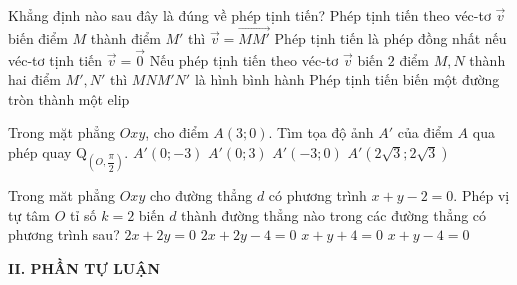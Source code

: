\begin{ex}%
Khẳng định nào sau đây là đúng về phép tịnh tiến?
	\choice
{\True Phép tịnh tiến theo véc-tơ $\vec{v}$ biến điểm $M$ thành điểm $M'$ thì $\vec{v} = \vec{MM'}$}
{Phép tịnh tiến là phép đồng nhất nếu véc-tơ tịnh tiến $\vec{v} = \vec{0}$}
{Nếu phép tịnh tiến theo véc-tơ $\vec{v}$ biến $2$ điểm $M, N$ thành hai điểm $M', N'$ thì $MNM'N'$ là hình bình hành}
{Phép tịnh tiến biến một đường tròn thành một elip}
\end{ex}
\begin{ex}%
Trong mặt phẳng $Oxy$, cho điểm $A(3;0)$. Tìm tọa độ ảnh $A'$ của điểm $A$ qua phép quay $\mathrm{Q}_{\left(O,\dfrac{\pi}{2} \right)}$.
	\choice
{$A'(0;-3)$}
{\True $A'(0;3)$}
{$A'(-3;0)$}
{$A'(2\sqrt{3};2\sqrt{3})$}
\end{ex}
\begin{ex}%
Trong măt phẳng $Oxy$ cho đường thẳng $d$ có phương trình $x + y - 2 = 0$. Phép vị tự
tâm $O$ tỉ số $k=2$ biến $d$ thành đường thẳng nào trong các đường thẳng có phương trình sau?
	\choice
{\True $2x+2y=0$}
{$2x+2y-4=0$}
{$x+y+4=0$}
{$x+y-4=0$}
\end{ex}

\noindent\textbf{II. PHẦN TỰ LUẬN}

